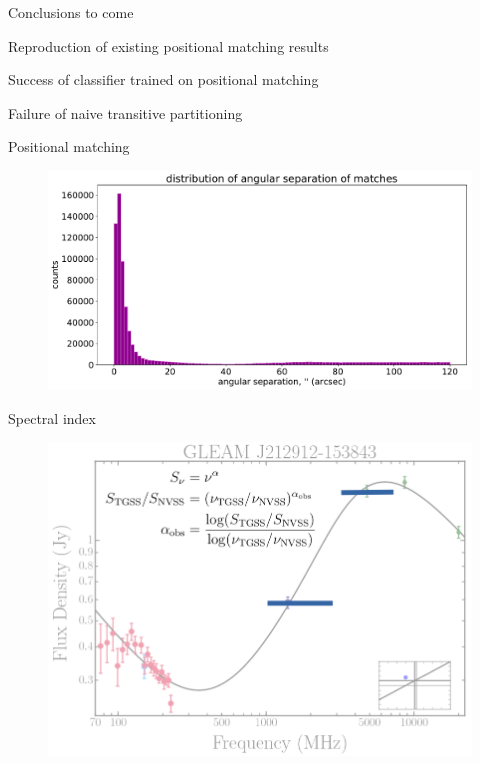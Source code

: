 \documentclass[12pt]{beamer}
\begin{document}
\begin{frame}{Conclusions to come}
\begin{block}{Reproduction of existing positional matching results}
\end{block}
\begin{exampleblock}{Success of classifier trained on positional matching}
\end{exampleblock}
\begin{alertblock}{Failure of naive transitive partitioning}
\end{alertblock}
\end{frame}

\begin{frame}{Positional matching}
\begin{figure}
    \centering
    \includegraphics[width=\textwidth]{pics/hist_angle.pdf}
\end{figure}
\end{frame}

\begin{frame}{Spectral index}
\begin{figure}
    \centering
    \includegraphics[height=0.8\textheight]{pics/gleam2.png}
\end{figure}
\end{frame}
\end{document}
